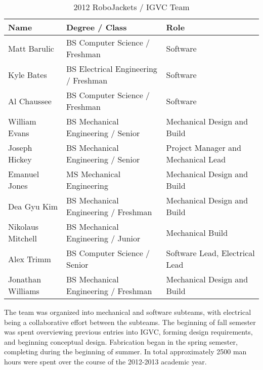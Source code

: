 \begin{table}[H]
\begin{center}
\caption{2012 RoboJackets / IGVC Team}
\begin{tabular}{| l | p{2.4in} | p{2in} |}
\hline
Name & Degree / Class & Role\\ \hline
Matt Barulic &		BS Computer Science / Freshman& Software\\ \hline
Kyle Bates & 		BS Electrical Engineering / Freshman& Software\\ \hline
Al Chaussee &		BS Computer Science / Freshman& Software\\ \hline
William Evans &		BS Mechanical Engineering / Senior& Mechanical Design and Build\\ \hline
Joseph Hickey &		BS Mechanical Engineering / Senior& Project Manager and	Mechanical Lead\\ \hline
Emanuel Jones &		MS Mechanical Engineering& Mechanical Design and Build\\ \hline
Dea Gyu Kim &	BS Mechanical Engineering / Freshman & Mechanical Design and Build\\ \hline
Nikolaus Mitchell &		BS Mechanical Engineering / Junior& Mechanical Build\\ \hline
Alex Trimm &	BS Computer Science / Senior&	Software Lead, Electrical Lead\\ \hline
Jonathan Williams &	BS Mechanical Engineering / Freshman & Mechanical Design and Build\\ \hline


\end{tabular}
\label{TAB:RJTeam}
\end{center}
\end{table}

The team was organized into mechanical and software subteams, with electrical being a collaborative effort between the subteams. The beginning of fall semester was spent overviewing previous entries into IGVC, forming design requirements, and beginning conceptual design. Fabrication began in the spring semester, completing during the beginning of summer. In total approximately 2500 man hours were spent over the course of the 2012-2013 academic year.

